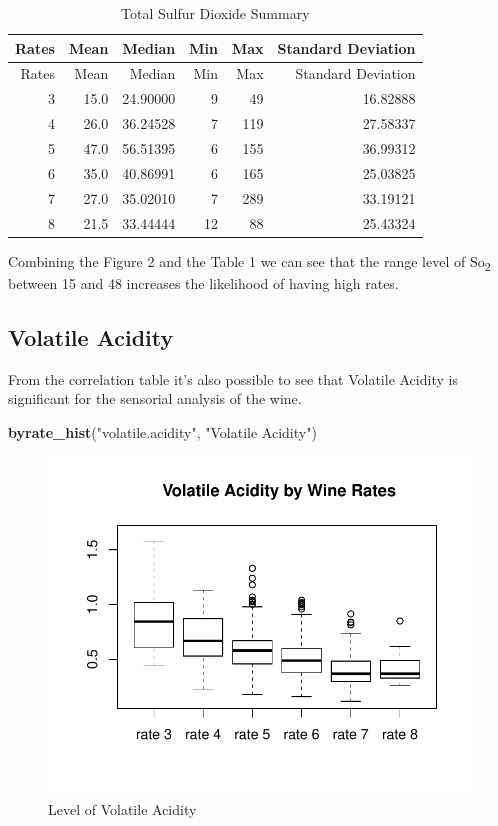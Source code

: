 \documentclass[]{article}
\newenvironment{Shaded}{\begin{snugshade}}{\end{snugshade}}
\newcommand{\KeywordTok}[1]{\textcolor[rgb]{0.13,0.29,0.53}{\textbf{{#1}}}}
\newcommand{\StringTok}[1]{\textcolor[rgb]{0.31,0.60,0.02}{{#1}}}
\newcommand{\NormalTok}[1]{{#1}}
\begin{document}
\begin{longtable}[c]{@{}rrrrrr@{}}
\caption{Total Sulfur Dioxide Summary}\tabularnewline
\toprule
Rates & Mean & Median & Min & Max & Standard Deviation\tabularnewline
\midrule
\endfirsthead
\toprule
Rates & Mean & Median & Min & Max & Standard Deviation\tabularnewline
\midrule
\endhead
3 & 15.0 & 24.90000 & 9 & 49 & 16.82888\tabularnewline
4 & 26.0 & 36.24528 & 7 & 119 & 27.58337\tabularnewline
5 & 47.0 & 56.51395 & 6 & 155 & 36.99312\tabularnewline
6 & 35.0 & 40.86991 & 6 & 165 & 25.03825\tabularnewline
7 & 27.0 & 35.02010 & 7 & 289 & 33.19121\tabularnewline
8 & 21.5 & 33.44444 & 12 & 88 & 25.43324\tabularnewline
\bottomrule
\end{longtable}

Combining the Figure 2 and the Table 1 we can see that the range level
of So\textsubscript{2} between 15 and 48 increases the likelihood of
having high rates.

\subsection{Volatile Acidity}\label{volatile-acidity}

From the correlation table it's also possible to see that Volatile
Acidity is significant for the sensorial analysis of the wine.

\begin{Shaded}
\begin{Highlighting}[]
\KeywordTok{byrate_hist}\NormalTok{(}\StringTok{"volatile.acidity"}\NormalTok{, }\StringTok{"Volatile Acidity"}\NormalTok{)}
\end{Highlighting}
\end{Shaded}

\begin{figure}[htbp]
\centering
\includegraphics{Project_files/figure-latex/unnamed-chunk-5-1.pdf}
\caption{Level of Volatile Acidity}
\end{figure}
\end{document}

